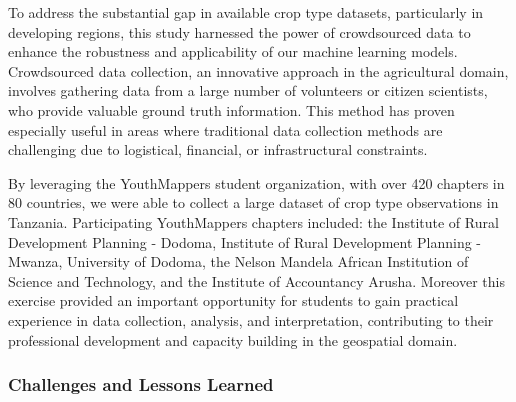 \documentclass[
  journal,
  twocolumn]{IEEEtran}
\begin{document}
To address the substantial gap in available crop type datasets,
particularly in developing regions, this study harnessed the power of
crowdsourced data to enhance the robustness and applicability of our
machine learning models. Crowdsourced data collection, an innovative
approach in the agricultural domain, involves gathering data from a
large number of volunteers or citizen scientists, who provide valuable
ground truth information. This method has proven especially useful in
areas where traditional data collection methods are challenging due to
logistical, financial, or infrastructural constraints.

By leveraging the YouthMappers student organization, with over 420
chapters in 80 countries, we were able to collect a large dataset of
crop type observations in Tanzania. Participating YouthMappers chapters
included: the Institute of Rural Development Planning - Dodoma,
Institute of Rural Development Planning - Mwanza, University of Dodoma,
the Nelson Mandela African Institution of Science and Technology, and
the Institute of Accountancy Arusha. Moreover this exercise provided an
important opportunity for students to gain practical experience in data
collection, analysis, and interpretation, contributing to their
professional development and capacity building in the geospatial domain.

\subsubsection{Challenges and Lessons
Learned}\label{challenges-and-lessons-learned}
\end{document}
